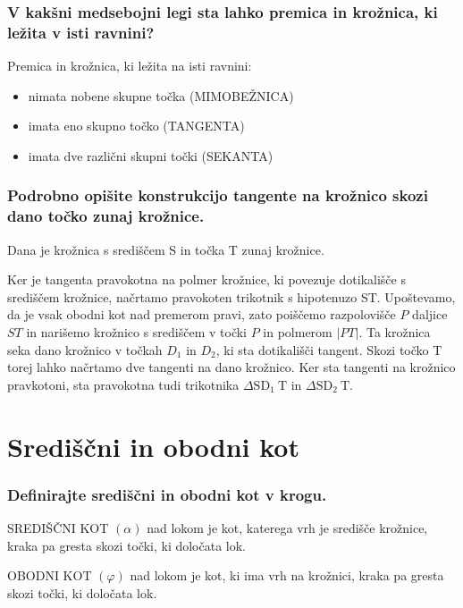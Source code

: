 \documentclass{article}
\begin{document}
\subsubsection*{V kakšni medsebojni legi sta lahko premica in krožnica, ki ležita v isti ravnini?}
Premica in krožnica, ki ležita na isti ravnini:
\begin{itemize}
  \item nimata nobene skupne točka (MIMOBEŽNICA)

  \item imata eno skupno točko (TANGENTA)

  \item imata dve različni skupni točki (SEKANTA)

\end{itemize}

\subsubsection*{Podrobno opišite konstrukcijo tangente na krožnico skozi dano točko zunaj krožnice.}

Dana je krožnica s središčem S in točka T zunaj krožnice.

Ker je tangenta pravokotna na polmer krožnice, ki povezuje dotikališče s središčem krožnice, načrtamo pravokoten trikotnik s hipotenuzo ST. Upoštevamo, da je vsak obodni kot nad premerom pravi, zato poiščemo razpolovišče $P$ daljice $S T$ in narišemo krožnico s središčem v točki $P$ in polmerom $|P T|$. Ta krožnica seka dano krožnico v točkah $D_{1}$ in $D_{2}$, ki sta dotikališči tangent. Skozi točko T torej lahko načrtamo dve tangenti na dano krožnico. Ker sta tangenti na krožnico pravkotoni, sta pravokotna tudi trikotnika $\Delta \mathrm{SD}_{1} \mathrm{~T}$ in $\Delta \mathrm{SD}_{2} \mathrm{~T}$.

\section{Središčni in obodni kot}
\subsubsection*{Definirajte središčni in obodni kot v krogu.}

SREDIŠČNI KOT $(\alpha)$ nad lokom je kot, katerega vrh je središče krožnice, kraka pa gresta skozi točki, ki določata lok.

OBODNI KOT $(\varphi)$ nad lokom je kot, ki ima vrh na krožnici, kraka pa gresta skozi točki, ki določata lok.
\end{document}
